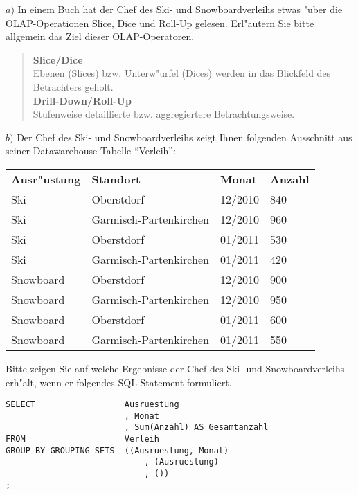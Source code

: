 \noindent
$a)$ In einem Buch hat der Chef des Ski- und Snowboardverleihs etwas "uber die OLAP-Operationen Slice, Dice und Roll-Up gelesen.
Erl"autern Sie bitte allgemein das Ziel dieser OLAP-Operatoren.

\begin{quote}
    \textbf{Slice/Dice}\\
    Ebenen (Slices) bzw. Unterw"urfel (Dices) werden in das Blickfeld des Betrachters geholt.\\
    \textbf{Drill-Down/Roll-Up}\\
    Stufenweise detaillierte bzw. aggregiertere Betrachtungsweise.\\
\end{quote}

\noindent
$b)$ Der Chef des Ski- und Snowboardverleihs zeigt Ihnen folgenden Ausschnitt aus seiner Datawarehouse-Tabelle "`Verleih"':\\

\begin{tabular}{ l l l l }
    \rowcolor{LightSlateGrey}
    \textbf{Ausr"ustung} & \textbf{Standort} & \textbf{Monat} & \textbf{Anzahl}\\
    Ski         & Oberstdorf                & 12/2010   & 840\\
    Ski         & Garmisch-Partenkirchen    & 12/2010   & 960\\
    Ski         & Oberstdorf                & 01/2011   & 530\\
    Ski         & Garmisch-Partenkirchen    & 01/2011   & 420\\
    Snowboard   & Oberstdorf                & 12/2010   & 900\\
    Snowboard   & Garmisch-Partenkirchen    & 12/2010   & 950\\
    Snowboard   & Oberstdorf                & 01/2011   & 600\\
    Snowboard   & Garmisch-Partenkirchen    & 01/2011   & 550\\
\end{tabular}

\bigskip

\noindent
Bitte zeigen Sie auf welche Ergebnisse der Chef des Ski- und Snowboardverleihs erh"alt, wenn er folgendes SQL-Statement formuliert.\\

\lstset{style=customSQL}
\begin{lstlisting}
SELECT                  Ausruestung
                        , Monat
                        , Sum(Anzahl) AS Gesamtanzahl
FROM                    Verleih
GROUP BY GROUPING SETS  ((Ausruestung, Monat)
                            , (Ausruestung)
                            , ())
;
\end{lstlisting}

